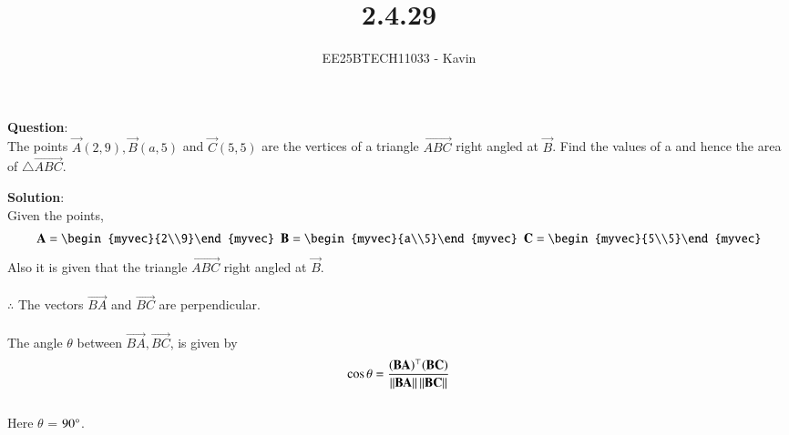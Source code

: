 \documentclass[journal]{IEEEtran}
\begin{document}

\vspace{3cm}

\title{2.4.29}
\author{EE25BTECH11033 - Kavin}
{\let\newpage\relax\maketitle}

\renewcommand{\thefigure}{\theenumi}
\renewcommand{\thetable}{\theenumi}
\setlength{\intextsep}{10pt} %
\textbf{Question}:\\
The points $\vec{A}(2, 9), \vec{B}(a, 5) $ and $\vec{C}(5, 5)$ are the vertices of a triangle $\vec{ABC}$ right angled at $\vec{B}$. Find the values of a and hence the area of $\triangle \vec{ABC}$.\\
\bigskip

\textbf{Solution}:\\
Given the points,
\begin{align}
    \vec{A}=\begin{myvec}{2\\9}\end{myvec}\ \ 
    \vec{B}=\begin{myvec}{a\\5}\end{myvec}\ \ 
    \vec{C}=\begin{myvec}{5\\5}\end{myvec}
\end{align}
Also it is given that the triangle $\vec{ABC}$ right angled at $\vec{B}$.\\
\\
$\therefore$ The vectors $\vec{BA}$ and $\vec{BC}$ are perpendicular.\\
\\
The angle $\theta$ between $\vec{BA}, \vec{BC}$,
is given by 
\begin{align}
	\label{eq:angle-inner}
		\cos\theta=\frac{{(\mathbf{BA})^{\top}}{(\mathbf{BC})}}{\left\lVert\mathbf{BA}\right\rVert\left\lVert\mathbf{BC}\right\rVert}
\end{align}
\bigskip
\\
Here $\theta$ = $90\degree$.
\end{document}
